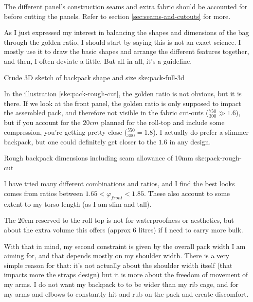 \begin{warning}
  The different panel's construction seams and extra fabric should be accounted for before cutting the panels. Refer to section \ref{sec:seams-and-cutouts} for more.
\end{warning}

As I just expressed my interest in balancing the shapes and dimensions of the bag through the golden ratio, I should start by saying this is not an exact science. I mostly use it to draw the basic shapes and arrange the different features together, and then, I often deviate a little. But all in all, it's a guideline.

{Crude 3D sketch of backpack shape and size}
{ske:pack-full-3d}


In the illustration \ref{ske:pack-rough-cut}, the golden ratio is not obvious, but it is there. If we look at the front panel, the golden ratio is only supposed to impact the assembled pack, and therefore not visible in the fabric cut-outs ($\frac{750}{300} \gg 1.6$), but if you account for the $20cm$ planned for the roll-top and include some compression, you're getting pretty close ($\frac{550}{300} = 1.8$). I actually do prefer a slimmer backpack, but one could definitely get closer to the $1.6$ in any design.

{Rough backpack dimensions including seam allowance of 10mm}
{ske:pack-rough-cut}

I have tried many different combinations and ratios, and I find the best looks comes from ratios between $1.65 < \varphi_{front} < 1.85$. These also account to some extent to my torso length (as I am slim and tall).

\begin{note}
  The 20cm reserved to the roll-top is not for waterproofness or aesthetics, but about the extra volume this offers (approx 6 litres) if I need to carry more bulk.
\end{note}

With that in mind, my second constraint is given by the overall pack width I am aiming for, and that depends mostly on my shoulder width. There is a very simple reason for that: it's not actually about the shoulder width itself (that impacts more the straps design) but it is more about the freedom of movement of my arms. I do not want my backpack to to be wider than my rib cage, and for my arms and elbows to constantly hit and rub on the pack and create discomfort.
